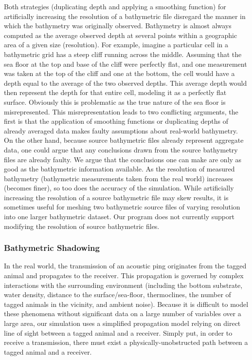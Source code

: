 Both strategies (duplicating depth and applying a smoothing function) for artificially increasing the resolution of a bathymetric file disregard the manner in which the bathymetry was originally observed.  Bathymetry is almost always computed as the average observed depth at several points within a geographic area of a given size (resolution).  For example, imagine a particular cell in a bathymetric grid has a steep cliff running across the middle.  Assuming that the sea floor at the top and base of the cliff were perfectly flat, and one measurement was taken at the top of the cliff and one at the bottom, the cell would have a depth equal to the average of the two observed depths.  This average depth would then represent the depth for that entire cell, modeling it as a perfectly flat surface.  Obviously this is problematic as the true nature of the sea floor is misrepresented.  This misrepresentation leads to two conflicting arguments, the first is that the application of smoothing functions or duplicating depths of already averaged data makes faulty assumptions about real-world bathymetry.  On the other hand, because source bathymetric files already represent aggregate data, one could argue that any conclusions drawn from the source bathymetry files are already faulty.  We argue that the conclusions one can make are only as good as the bathymetric information available.  As the resolution of measured bathymetry (bathymetric measurements taken from the real world) increases (becomes finer), so too does the accuracy of the simulation.  While artificially increasing the resolution of a source bathymetric file may skew results, it is sometimes useful for meshing two bathymetric source files of varying resolution into one larger bathymetric dataset.  Our program does not currently support modifying the resolution of source bathymetric files.


\subsubsection{Bathymetric Shadowing}
\label{bathymetricShadowing}
In the real world, the transmission of an acoustic ping originates from the tagged animal and propagates to the receiver.  This propagation is governed by complex interactions with the surrounding environment (including the bottom substrate, water density, distance to the surface/sea-floor, thermoclines, the number of tagged animals in the vicinity, and ambient noise).  Because it is difficult to model these phenomena without significant data on a large number of variables over a large area, our simulation uses a simplified propagation model relying on direct line of sight between a tagged animal and a receiver.  Simply put, in order to receive a transmission, there must exist a physically-unobstructed path between a tagged animal and a receiver.  


